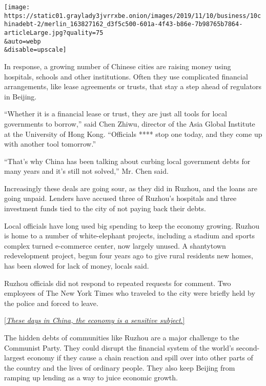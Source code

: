 \texttt{[image: https://static01.graylady3jvrrxbe.onion/images/2019/11/10/business/10chinadebt-2/merlin\_163827162\_d3f5c500-601a-4f43-b86e-7b98765b7864-articleLarge.jpg?quality=75\\\&auto=webp\\\&disable=upscale]}

In response, a growing number of Chinese cities are raising money using
hospitals, schools and other institutions. Often they use complicated
financial arrangements, like lease agreements or trusts, that stay a
step ahead of regulators in Beijing.

``Whether it is a financial lease or trust, they are just all tools for
local governments to borrow,'' said Chen Zhiwu, director of the Asia
Global Institute at the University of Hong Kong. ``Officials **** stop
one today, and they come up with another tool tomorrow.''

``That's why China has been talking about curbing local government debts
for many years and it's still not solved,'' Mr. Chen said.

Increasingly these deals are going sour, as they did in Ruzhou, and the
loans are going unpaid. Lenders have accused three of Ruzhou's hospitals
and three investment funds tied to the city of not paying back their
debts.

Local officials have long used big spending to keep the economy growing.
Ruzhou is home to a number of white-elephant projects, including a
stadium and sports complex turned e-commerce center, now largely unused.
A shantytown redevelopment project, begun four years ago to give rural
residents new homes, has been slowed for lack of money, locals said.

Ruzhou officials did not respond to repeated requests for comment. Two
employees of The New York Times who traveled to the city were briefly
held by the police and forced to leave.

\href{https://www.nytimes3xbfgragh.onion/2019/11/10/business/china-reporter-police.html}{{[}}\href{https://www.nytimes3xbfgragh.onion/2019/11/10/business/china-reporter-police.html}{\emph{These
days in China, the economy is a sensitive
subject}}\href{https://www.nytimes3xbfgragh.onion/2019/11/10/business/china-reporter-police.html}{.{]}}

The hidden debts of communities like Ruzhou are a major challenge to the
Communist Party. They could disrupt the financial system of the world's
second-largest economy if they cause a chain reaction and spill over
into other parts of the country and the lives of ordinary people. They
also keep Beijing from ramping up lending as a way to juice economic
growth.

